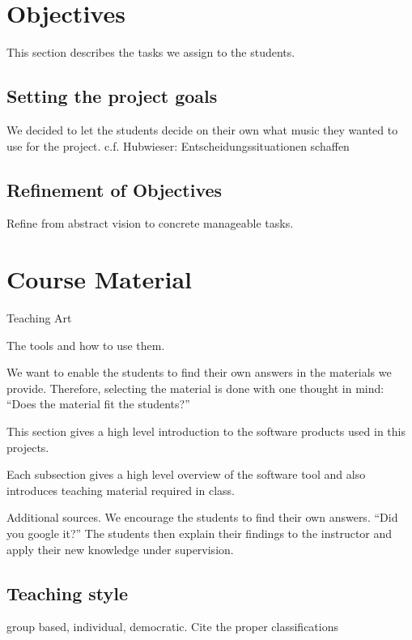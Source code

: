 \documentclass[onecolumn,nocopyrightspace,preprint]{sigplanconf}
\begin{document}
\section{Objectives}\label{sec:objectives}

This section describes the tasks we assign to the students.

\subsection{Setting the project goals}

We decided to let the students decide on their own what music they wanted to use for the project.
c.f. Hubwieser: Entscheidungssituationen schaffen


\subsection{Refinement of Objectives}

Refine from abstract vision to concrete manageable tasks.



\section{Course Material}

Teaching Art~\cite{book:Peez2008}

The tools and how to use them.

We want to enable the students to find their own answers in the materials
we provide. Therefore, selecting the material is done with one thought
in mind: ``Does the material fit the students?''

This section gives a high level introduction to the software products
used in this projects.

Each subsection gives a high level overview of the software tool and
also introduces teaching material required in class.

Additional sources. We encourage the students to find their own answers.
``Did you google it?''
The students then explain their findings to the instructor and apply their
new knowledge under supervision.


\subsection{Teaching style}
group based, individual, democratic. Cite the proper classifications~\cite{book:Hubwieser2007}
\end{document}
